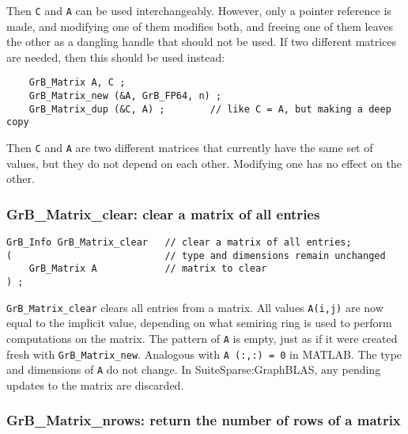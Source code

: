 \documentclass[12pt]{article}
\begin{document}
Then \verb'C' and \verb'A' can be used interchangeably.  However, only a
pointer reference is made, and modifying one of them modifies both, and freeing
one of them leaves the other as a dangling handle that should not be used.  If
two different matrices are needed, then this should be used instead:

    {\footnotesize
    \begin{verbatim}
    GrB_Matrix A, C ;
    GrB_Matrix_new (&A, GrB_FP64, n) ;
    GrB_Matrix_dup (&C, A) ;        // like C = A, but making a deep copy \end{verbatim}}

Then \verb'C' and \verb'A' are two different matrices that currently have the
same set of values, but they do not depend on each other.  Modifying one has
no effect on the other.

\subsubsection{{\sf GrB\_Matrix\_clear:}        clear a matrix of all entries}
\label{matrix_clear}

\begin{mdframed}[userdefinedwidth=6in]
{\footnotesize
\begin{verbatim}
GrB_Info GrB_Matrix_clear   // clear a matrix of all entries;
(                           // type and dimensions remain unchanged
    GrB_Matrix A            // matrix to clear
) ;
\end{verbatim} } \end{mdframed}

\verb'GrB_Matrix_clear' clears all entries from a matrix.  All values
\verb'A(i,j)' are now equal to the implicit value, depending on what semiring
ring is used to perform computations on the matrix.  The pattern of \verb'A' is
empty, just as if it were created fresh with \verb'GrB_Matrix_new'.  Analogous
with \verb'A (:,:) = 0' in MATLAB.  The type and dimensions of \verb'A' do not
change.  In SuiteSparse:Graph\-BLAS, any pending updates to the matrix are
discarded.

\subsubsection{{\sf GrB\_Matrix\_nrows:}        return the number of rows of a matrix}
\label{matrix_nrows}
\end{document}
